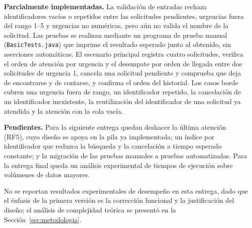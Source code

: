 \textbf{Parcialmente implementadas.} La validación de entradas rechaza
identificadores vacíos o repetidos entre las solicitudes pendientes,
urgencias fuera del rango 1--5 y urgencias no numéricas, pero aún no valida
el nombre de la solicitud. Las pruebas se realizan mediante un programa de
prueba manual (\texttt{BasicTests.java}) que imprime el resultado esperado
junto al obtenido, sin aserciones automáticas. El escenario principal
registra cuatro solicitudes, verifica el orden de atención por urgencia y
el desempate por orden de llegada entre dos solicitudes de urgencia 1,
cancela una solicitud pendiente y comprueba que deja de encontrarse y de
contarse, y confirma el orden del historial. Los casos borde cubren una
urgencia fuera de rango, un identificador repetido, la cancelación de un
identificador inexistente, la reutilización del identificador de una
solicitud ya atendida y la atención con la cola vacía.

\textbf{Pendientes.} Para la siguiente entrega quedan deshacer la última
atención (RF5), cuyo diseño se apoya en la pila ya implementada; un índice
por identificador que reduzca la búsqueda y la cancelación a tiempo
esperado constante; y la migración de las pruebas manuales a pruebas
automatizadas. Para la entrega final queda un análisis experimental de
tiempos de ejecución sobre volúmenes de datos mayores.

No se reportan resultados experimentales de desempeño en esta entrega,
dado que el énfasis de la primera versión es la corrección funcional y la
justificación del diseño; el análisis de complejidad teórica se presentó
en la Sección~\ref{sec:metodologia}.
